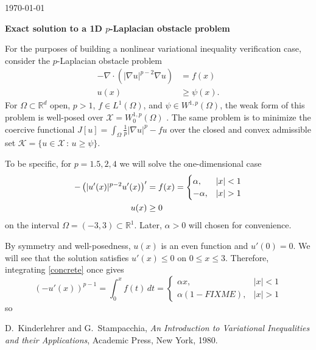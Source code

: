 \documentclass[11pt]{amsart}
\newcommand{\Div}{\ensuremath{\nabla\cdot}}
\newcommand{\grad}{\nabla}
\newcommand{\RR}{\mathbb{R}}
\begin{document}
\scriptsize \hfill \today

\Large
\bigskip
\centerline{\textbf{Exact solution to a 1D $p$-Laplacian obstacle problem}}
\bigskip

\normalsize

\thispagestyle{empty}

For the purposes of building a nonlinear variational inequality verification case, consider the $p$-Laplacian obstacle problem
\begin{align*}
-\Div(|\grad u|^{p-2} \grad u) &= f(x) \\
u(x) &\ge \psi(x).
\end{align*}
For $\Omega\subset \RR^d$ open, $p>1$, $f \in L^1(\Omega)$, and $\psi \in W^{1,p}(\Omega)$, the weak form of this problem is well-posed over $\mathcal{X} = W_0^{1,p}(\Omega)$ \cite{KinderlehrerStampacchia1980}.  The same problem is to minimize the coercive functional $J[u] = \int_\Omega \frac{1}{p} |\grad u|^p - f u$ over the closed and convex admissible set $\mathcal{K}=\{u \in \mathcal{X}\,:\, u \ge \psi\}$.

To be specific, for $p=1.5,2,4$ we will solve the one-dimensional case
\begin{align}
-\left(|u'(x)|^{p-2} u'(x)\right)' &= f(x) = \begin{cases} \alpha, & |x| < 1 \\ -\alpha, & |x| > 1\end{cases} \label{concrete} \\
u(x) &\ge 0 \notag
\end{align}
on the interval $\Omega = (-3,3) \subset \RR^1$.  Later, $\alpha>0$ will chosen for convenience.

By symmetry and well-posedness, $u(x)$ is an even function and $u'(0)=0$.  We will see that the solution satisfies $u'(x)\le 0$ on $0 \le x \le 3$.  Therefore, integrating \eqref{concrete} once gives
    $$\left(-u'(x)\right)^{p-1} = \int_0^x f(t)\,dt = \begin{cases} \alpha x, & |x| < 1 \\ \alpha (1 - FIXME), & |x| > 1\end{cases}$$
so 

\begin{thebibliography}{1}

{\sc D.~Kinderlehrer and G.~Stampacchia}, {\em An {I}ntroduction to
  {V}ariational {I}nequalities and their {A}pplications}, Academic Press, New
  York, 1980.

\end{thebibliography}
\end{document}
